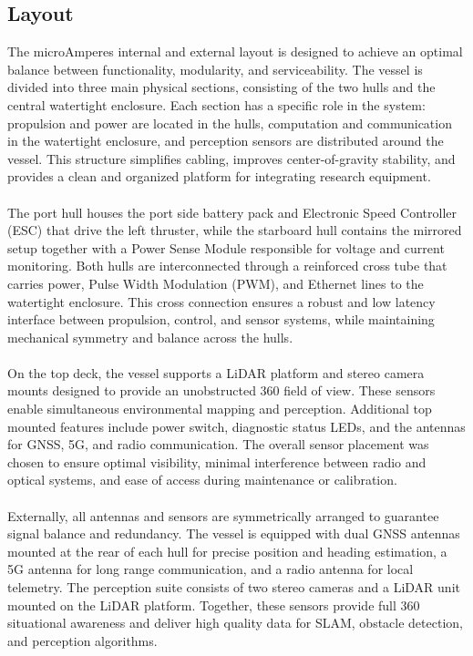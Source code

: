 \subsection{Layout}
The microAmperes internal and external layout is designed to achieve an optimal balance between functionality, modularity, and serviceability. The vessel is divided into three main physical sections, consisting of the two hulls and the central watertight enclosure. Each section has a specific role in the system: propulsion and power are located in the hulls, computation and communication in the watertight enclosure, and perception sensors are distributed around the vessel. This structure simplifies cabling, improves center-of-gravity stability, and provides a clean and organized platform for integrating research equipment.
\\ \\
The port hull houses the port side battery pack and Electronic Speed Controller (ESC) that drive the left thruster, while the starboard hull contains the mirrored setup together with a Power Sense Module responsible for voltage and current monitoring. Both hulls are interconnected through a reinforced cross tube that carries power, Pulse Width Modulation (PWM), and Ethernet lines to the watertight enclosure. This cross connection ensures a robust and low latency interface between propulsion, control, and sensor systems, while maintaining mechanical symmetry and balance across the hulls.
\\ \\
On the top deck, the vessel supports a LiDAR platform and stereo camera mounts designed to provide an unobstructed 360\textdegree{} field of view.  These sensors enable simultaneous environmental mapping and perception. Additional top mounted features include power switch, diagnostic status LEDs, and the antennas for GNSS, 5G, and radio communication. The overall sensor placement was chosen to ensure optimal visibility, minimal interference between radio and optical systems, and ease of access during maintenance or calibration.
\\ \\
Externally, all antennas and sensors are symmetrically arranged to guarantee signal balance and redundancy. The vessel is equipped with dual GNSS antennas mounted at the rear of each hull for precise position and heading estimation, a 5G antenna for long range communication, and a radio antenna for local telemetry. The perception suite consists of two stereo cameras and a LiDAR unit mounted on the LiDAR platform. Together, these sensors provide full 360\textdegree{} situational awareness and deliver high quality data for SLAM, obstacle detection, and perception algorithms. 
